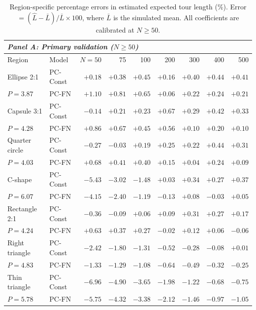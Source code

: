 \begin{table}[htbp]
\centering
\caption{Region-specific percentage errors in estimated expected tour length (\%). Error $= (\hat{L} - \bar{L})/\bar{L} \times 100$, where $\bar{L}$ is the simulated mean. All coefficients are calibrated at $N \ge 50$.}
\label{tab:A1}
\footnotesize
\begin{tabular}{llrrrrrrr}
\toprule
\multicolumn{9}{l}{\textit{Panel A: Primary validation ($N \ge 50$)}} \\
\midrule
Region & Model & $N = 50$ & 75 & 100 & 200 & 300 & 400 & 500 \\
\midrule
Ellipse 2:1 & PC-Const & $+0.18$ & $+0.38$ & $+0.45$ & $+0.16$ & $+0.40$ & $+0.44$ & $+0.41$ \\
$P = 3.87$ & PC-FN & $+1.10$ & $+0.81$ & $+0.65$ & $+0.06$ & $+0.22$ & $+0.24$ & $+0.21$ \\
\addlinespace[2pt]
Capsule 3:1 & PC-Const & $-0.14$ & $+0.21$ & $+0.23$ & $+0.67$ & $+0.29$ & $+0.42$ & $+0.33$ \\
$P = 4.28$ & PC-FN & $+0.86$ & $+0.67$ & $+0.45$ & $+0.56$ & $+0.10$ & $+0.20$ & $+0.10$ \\
\addlinespace[2pt]
Quarter circle & PC-Const & $-0.27$ & $-0.03$ & $+0.19$ & $+0.25$ & $+0.22$ & $+0.44$ & $+0.31$ \\
$P = 4.03$ & PC-FN & $+0.68$ & $+0.41$ & $+0.40$ & $+0.15$ & $+0.04$ & $+0.24$ & $+0.09$ \\
\addlinespace[2pt]
C-shape & PC-Const & $-5.43$ & $-3.02$ & $-1.48$ & $+0.03$ & $+0.34$ & $+0.27$ & $+0.37$ \\
$P = 6.07$ & PC-FN & $-4.15$ & $-2.40$ & $-1.19$ & $-0.13$ & $+0.08$ & $-0.03$ & $+0.05$ \\
\addlinespace[2pt]
Rectangle 2:1 & PC-Const & $-0.36$ & $-0.09$ & $+0.06$ & $+0.09$ & $+0.31$ & $+0.27$ & $+0.17$ \\
$P = 4.24$ & PC-FN & $+0.63$ & $+0.37$ & $+0.27$ & $-0.02$ & $+0.12$ & $+0.06$ & $-0.06$ \\
\addlinespace[2pt]
Right triangle & PC-Const & $-2.42$ & $-1.80$ & $-1.31$ & $-0.52$ & $-0.28$ & $-0.08$ & $+0.01$ \\
$P = 4.83$ & PC-FN & $-1.33$ & $-1.29$ & $-1.08$ & $-0.64$ & $-0.49$ & $-0.32$ & $-0.25$ \\
\addlinespace[2pt]
Thin triangle & PC-Const & $-6.96$ & $-4.90$ & $-3.65$ & $-1.98$ & $-1.22$ & $-0.68$ & $-0.75$ \\
$P = 5.78$ & PC-FN & $-5.75$ & $-4.32$ & $-3.38$ & $-2.12$ & $-1.46$ & $-0.97$ & $-1.05$ \\

\end{tabular}
\end{table}
